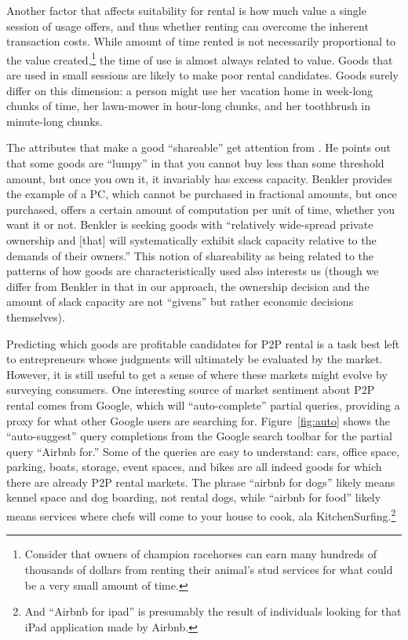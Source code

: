 \documentclass[12pt]{article}
\begin{document}
Another factor that affects suitability for rental is how much value a single session of usage offers, and thus whether renting can overcome the inherent transaction costs.
While amount of time rented is not necessarily proportional to the value created,\footnote{
  Consider that owners of champion racehorses can earn many hundreds of thousands of dollars from renting their animal's stud services for what could be a very small amount of time.}  
the time of use is almost always related to value.
Goods that are used in small sessions are likely to make poor rental candidates.
Goods surely differ on this dimension: 
a person might use her vacation home in week-long chunks of time, her lawn-mower in hour-long chunks, and her toothbrush in minute-long chunks. 

The attributes that make a good ``shareable'' get attention from \cite{benkler2004sharing}.
He points out that some goods are ``lumpy'' in that you cannot buy less than some threshold amount, but once you own it, it invariably has excess capacity. 
Benkler provides the example of a PC, which cannot be purchased in fractional amounts, but once purchased, offers a certain amount of computation per unit of time, whether you want it or not. 
Benkler is seeking goods with ``relatively wide-spread private ownership and [that] will systematically exhibit slack capacity relative to the demands of their owners.''
This notion of shareability as being related to the patterns of how goods are characteristically used also interests us (though we differ from Benkler in that in our approach, the ownership decision and the amount of slack capacity are not ``givens'' but rather economic decisions themselves). 

Predicting which goods are profitable candidates for P2P rental is a task best left to entrepreneurs whose judgments will ultimately be evaluated by the market. 
However, it is still useful to get a sense of where these markets might evolve by surveying consumers. 
One interesting source of market sentiment about P2P rental comes from Google, which will ``auto-complete'' partial queries, providing a proxy for what other Google users are searching for. 
Figure~\ref{fig:auto} shows the ``auto-suggest'' query completions from the Google search toolbar for the partial query ``Airbnb for.''
Some of the queries are easy to understand: 
cars, office space, parking, boats, storage, event spaces, and bikes are all indeed goods for which there are already P2P rental markets. 
The phrase ``airbnb for dogs'' likely means kennel space and dog boarding, not rental dogs, while ``airbnb for food'' likely means services where chefs will come to your house to cook, ala KitchenSurfing.\footnote{
  And ``Airbnb for ipad'' is presumably the result of individuals looking for that iPad application made by Airbnb.
}
\end{document}
